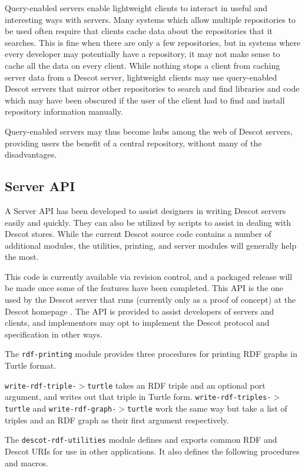 \documentclass[9pt,cm,twocolumn,preprint]{sigplanconf}
\begin{document}
Query-enabled servers enable lightweight clients to interact 
in useful and interesting ways with servers. 
Many systems which allow multiple repositories to be used often require 
that clients cache data about the repositories that it searches.
This is fine when there are only a few repositories, but in systems where 
every developer may potentially have a repository, 
it may not make sense to cache all the data on every client. 
While nothing stops a client from caching server data from a Descot 
server, lightweight clients may use query-enabled Descot servers 
that mirror other repositories to search and find libraries and code which 
may have been obscured if the user of the client had to find and install 
repository information manually. 

Query-enabled servers may thus become hubs among the web 
of Descot servers, providing users the benefit of a central repository, 
without many of the disadvantages. 

\subsection{Server API}%
A Server API has been developed to assist designers in writing 
Descot servers easily and quickly. They can also be utilized by 
scripts to assist in dealing with Descot stores.  While the 
current Descot source code contains a number of additional 
modules, the utilities, printing, and server modules will 
generally help the most. 

This code is currently available via revision control, and
a packaged release will be made once some of the features have 
been completed. This API is the one used by the Descot 
server that runs (currently only as a proof of concept) 
at the Descot homepage \cite{descot}. The API is provided to 
assist developers of servers and clients, and implementors 
may opt to implement the Descot protocol and specification 
in other ways.

The {\tt rdf-printing} module provides three procedures for 
printing RDF graphs in Turtle format. 

{\tt write-rdf-triple-$>$turtle} takes an RDF triple and 
an optional port argument, and writes out that triple in 
Turtle form. {\tt write-rdf-triples-$>$turtle} and 
{\tt write-rdf-graph-$>$turtle} work the same way but 
take a list of triples and an RDF graph as their first 
argument respectively. 

The {\tt descot-rdf-utilities} module defines and exports 
common RDF and Descot URIs for use in other applications. 
It also defines the following procedures and macros.
\end{document}
